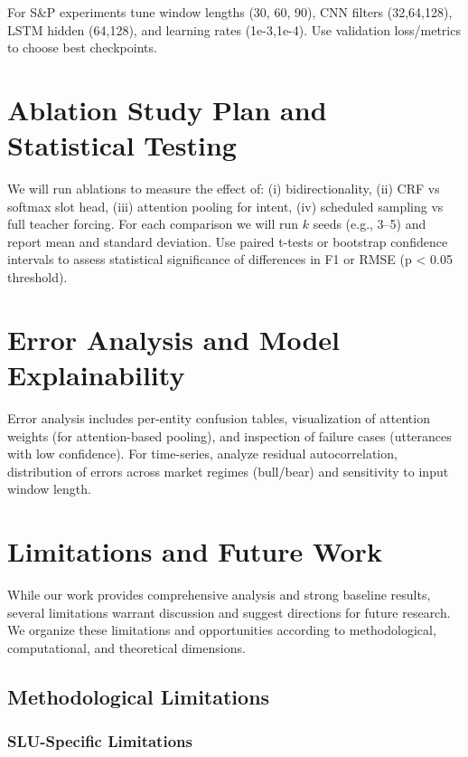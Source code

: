 \documentclass[conference]{IEEEtran}
\begin{document}
For S\&P experiments tune window lengths (30, 60, 90), CNN filters (32,64,128), LSTM hidden (64,128), and learning rates (1e-3,1e-4). Use validation loss/metrics to choose best checkpoints.

\section{Ablation Study Plan and Statistical Testing}
We will run ablations to measure the effect of: (i) bidirectionality, (ii) CRF vs softmax slot head, (iii) attention pooling for intent, (iv) scheduled sampling vs full teacher forcing. For each comparison we will run $k$ seeds (e.g., 3--5) and report mean and standard deviation. Use paired t-tests or bootstrap confidence intervals to assess statistical significance of differences in F1 or RMSE (p < 0.05 threshold).

\section{Error Analysis and Model Explainability}
Error analysis includes per-entity confusion tables, visualization of attention weights (for attention-based pooling), and inspection of failure cases (utterances with low confidence). For time-series, analyze residual autocorrelation, distribution of errors across market regimes (bull/bear) and sensitivity to input window length.

\section{Limitations and Future Work}

While our work provides comprehensive analysis and strong baseline results, several limitations warrant discussion and suggest directions for future research. We organize these limitations and opportunities according to methodological, computational, and theoretical dimensions.

\subsection{Methodological Limitations}

\subsubsection{SLU-Specific Limitations}
\end{document}

